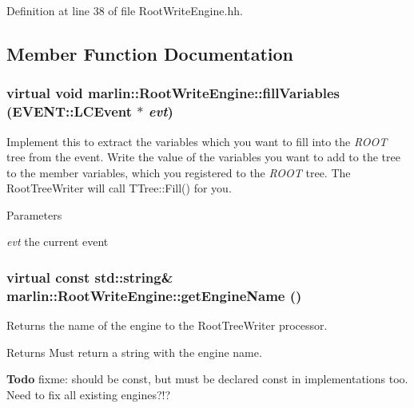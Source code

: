Definition at line 38 of file RootWriteEngine.hh.

\subsection{Member Function Documentation}
\subsubsection[{fillVariables}]{\setlength{\rightskip}{0pt plus 5cm}virtual void marlin::RootWriteEngine::fillVariables (EVENT::LCEvent $\ast$ {\em evt})\hspace{0.3cm}{\ttfamily  [pure virtual]}}\label{classmarlin_1_1RootWriteEngine_ace823bd839cee7e8c8755e60c4cc7134}


Implement this to extract the variables which you want to fill into the {\itshape ROOT\/} tree from the event. Write the value of the variables you want to add to the tree to the member variables, which you registered to the {\itshape ROOT\/} tree. The RootTreeWriter will call TTree::Fill() for you. 
\begin{DoxyParams}{Parameters}
\item[{\em evt}]the current event \end{DoxyParams}
\subsubsection[{getEngineName}]{\setlength{\rightskip}{0pt plus 5cm}virtual const std::string\& marlin::RootWriteEngine::getEngineName ()\hspace{0.3cm}{\ttfamily  [pure virtual]}}\label{classmarlin_1_1RootWriteEngine_a31e38120fe60efcb15666fd569ba5862}


Returns the name of the engine to the RootTreeWriter processor. \begin{DoxyReturn}{Returns}
Must return a string with the engine name. 
\end{DoxyReturn}
\begin{Desc}
\item[{\bf Todo}]fixme: should be const, but must be declared const in implementations too. Need to fix all existing engines?!? \end{Desc}
